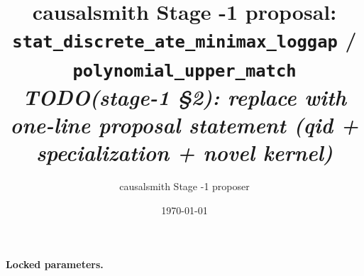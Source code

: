 \documentclass[11pt]{article}
\title{causalsmith Stage -1 proposal: \texttt{stat\_discrete\_ate\_minimax\_loggap} / \texttt{polynomial\_upper\_match}%
  \\ \large\textit{TODO(stage-1 \S2): replace with one-line proposal statement (qid + specialization + novel kernel)}}
\author{causalsmith Stage -1 proposer}
\date{\today}
\theoremstyle{definition}
\theoremstyle{plain}
\theoremstyle{remark}
\begin{document}
\maketitle


\paragraph{Locked parameters.}

\begin{abstract}
\end{abstract}
\end{document}
